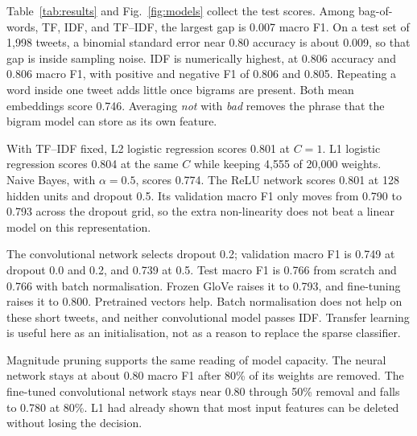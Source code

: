 \documentclass[conference]{IEEEtran}
\begin{document}
Table~\ref{tab:results} and Fig.~\ref{fig:models} collect the test scores. Among bag-of-words, TF, IDF, and TF--IDF, the largest gap is 0.007 macro F1. On a test set of 1{,}998 tweets, a binomial standard error near 0.80 accuracy is about 0.009, so that gap is inside sampling noise. IDF is numerically highest, at 0.806 accuracy and 0.806 macro F1, with positive and negative F1 of 0.806 and 0.805. Repeating a word inside one tweet adds little once bigrams are present. Both mean embeddings score 0.746. Averaging \emph{not} with \emph{bad} removes the phrase that the bigram model can store as its own feature.

With TF--IDF fixed, L2 logistic regression scores 0.801 at $C=1$. L1 logistic regression scores 0.804 at the same $C$ while keeping 4{,}555 of 20{,}000 weights. Naive Bayes, with $\alpha=0.5$, scores 0.774. The ReLU network scores 0.801 at 128 hidden units and dropout 0.5. Its validation macro F1 only moves from 0.790 to 0.793 across the dropout grid, so the extra non-linearity does not beat a linear model on this representation.

The convolutional network selects dropout 0.2; validation macro F1 is 0.749 at dropout 0.0 and 0.2, and 0.739 at 0.5. Test macro F1 is 0.766 from scratch and 0.766 with batch normalisation. Frozen GloVe raises it to 0.793, and fine-tuning raises it to 0.800. Pretrained vectors help. Batch normalisation does not help on these short tweets, and neither convolutional model passes IDF. Transfer learning is useful here as an initialisation, not as a reason to replace the sparse classifier.

Magnitude pruning supports the same reading of model capacity. The neural network stays at about 0.80 macro F1 after 80\% of its weights are removed. The fine-tuned convolutional network stays near 0.80 through 50\% removal and falls to 0.780 at 80\%. L1 had already shown that most input features can be deleted without losing the decision.
\end{document}
